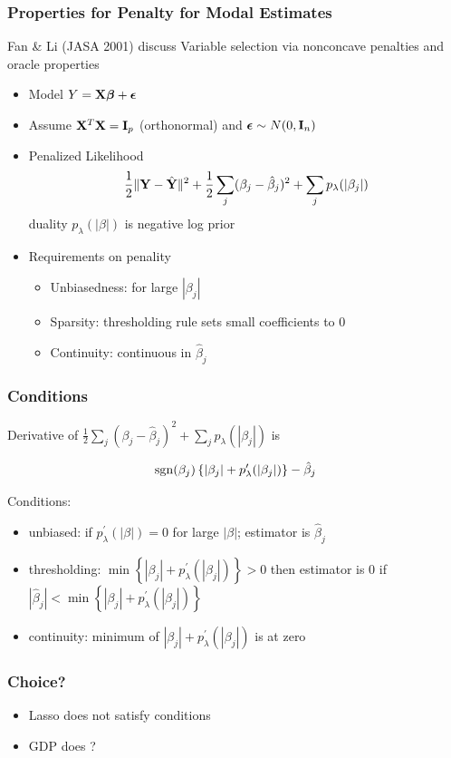 \documentclass[]{beamer}
\begin{document}
\begin{frame} \frametitle{Properties for Penalty for Modal Estimates}
Fan \& Li (JASA 2001) discuss Variable
selection via nonconcave penalties and oracle properties  \pause
\begin{itemize}
\item Model $Y = \mathbf{X} \boldsymbol{\beta} + \boldsymbol{\epsilon}$ \pause
\item Assume $\mathbf{X}^T\mathbf{X} = \mathbf{I}_p$  (orthonormal) and $\boldsymbol{\epsilon} \sim N(0, \mathbf{I}_n)$\pause
\item Penalized Likelihood
$$\frac 1 2 \|\mathbf{Y} - \hat{\mathbf{Y}}\|^2 + \frac 1 2 \sum_j(\beta_j - \hat{\beta}_j)^2 +  \sum_j p_\lambda(|\beta_j|)$$ \pause
duality $ p_\lambda(|\beta|)$ is negative log prior

\item Requirements on penality \pause
\begin{itemize}
  \item Unbiasedness: for large $|\beta_j|$ \pause
  \item Sparsity: thresholding rule sets small coefficients to 0 \pause
  \item Continuity:  continuous in $\hat{\beta}_j$
\end{itemize}
\end{itemize}
\end{frame}


\begin{frame} \frametitle{Conditions}
Derivative of  $\frac 1 2 \sum_j(\beta_j - \hat{\beta}_j)^2 +  \sum_j p_\lambda(|\beta_j|)$
is

$$\operatorname{sgn}(\beta_j)\left\{|\beta_j| + p^\prime_\lambda(|\beta_j|) \right\} - \hat{\beta}_j$$

Conditions:

\begin{itemize}
\item unbiased: if $ p^\prime_\lambda(|\beta|) = 0$ for large $|\beta|$; estimator is $\hat{\beta}_j$
\item thresholding: $\min \left\{ |\beta_j| + p^\prime_\lambda(|\beta_j|)\right\} > 0$ then estimator is 0 if $|\hat{\beta}_j| < \min \left\{ |\beta_j| + p^\prime_\lambda(|\beta_j|) \right\} $
\item continuity:  minimum of $|\beta_j| + p^\prime_\lambda(|\beta_j|)$ is at zero
\end{itemize}
\end{frame}

\begin{frame}\frametitle{Choice?}
\begin{itemize}
\item Lasso does not satisfy conditions
\item GDP does ?
\end{itemize}
\end{frame}
\end{document}

